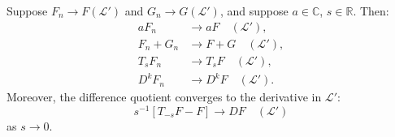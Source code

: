 Suppose $F_n \to F (\mathcal{L}')$ and $G_n \to G (\mathcal{L}')$, and suppose $a \in \mathbb{C}$, $s \in \mathbb{R}$. Then:
\begin{align*}
aF_n &\to aF \quad (\mathcal{L}'), \\
F_n + G_n &\to F + G \quad (\mathcal{L}'), \\
T_s F_n &\to T_s F \quad (\mathcal{L}'), \\
D^k F_n &\to D^k F \quad (\mathcal{L}').
\end{align*}
Moreover, the difference quotient converges to the derivative in $\mathcal{L}'$:
$$s^{-1}[T_{-s}F - F] \to DF \quad (\mathcal{L}')$$
as $s \to 0$.
